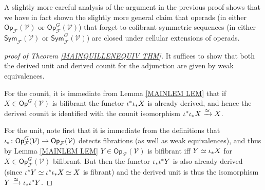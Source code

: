 \documentclass[a4paper,10pt]{article}%
\begin{document}
\begin{remark}
	A slightly more careful analysis of the argument in the previous proof shows that we have in fact shown the slightly more general claim that operads 
(in either 
$\mathsf{Op}_{\mathcal{F}}(\mathcal{V})$ or
$\mathsf{Op}_{\mathcal{F}}^G(\mathcal{V})$)
that forget to cofibrant symmetric sequences
(in either 
$\mathsf{Sym}_{\mathcal{F}}(\mathcal{V})$ or
$\mathsf{Sym}_{\mathcal{F}}^G(\mathcal{V})$)
are closed under cellular extensions of operads. 
\end{remark}



\begin{proof}[proof of Theorem \ref{MAINQUILLENEQUIV THM}]
It suffices to show that both the derived unit and derived counit for the adjunction are given by weak equivalences.

For the counit, it is immediate from Lemma \ref{MAINLEM LEM} that if $X \in \mathsf{Op}^G(\mathcal{V})$ is bifibrant
the functor $\iota^{\**} \iota_{\**} X$ is already derived, and hence the derived counit is identified with the counit isomorphism $\iota^{\**} \iota_{\**} X \xrightarrow{\simeq} X$.

For the unit, note first that it is immediate from the definitions that 
$\iota_{\**} \colon 
\mathsf{Op}^{G}_{\mathcal{F}}(\mathcal{V})\to 
\mathsf{Op}_{\mathcal{F}}(\mathcal{V})$
detects fibrations (as well as weak equivalences), 
and thus by Lemma \ref{MAINLEM LEM}
$Y \in \mathsf{Op}_{\mathcal{F}}(\mathcal{V})$
is bifibrant iff $Y \simeq \iota_{\**} X$
for $X \in \mathsf{Op}^{G}_{\mathcal{F}}(\mathcal{V})$ bifibrant.
But then the functor $\iota_{\**} \iota^{\**} Y$ 
is also already derived (since $\iota^{\**} Y \simeq \iota^{\**}\iota_{\**} X \simeq X$ is fibrant) and the derived unit is thus the isomorphism
$Y \xrightarrow{\simeq} \iota_{\**} \iota^{\**} Y$.
\end{proof}
\end{document}
